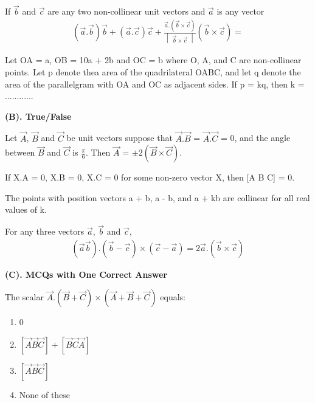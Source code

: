 \item If $\overrightarrow{b}$ and $\overrightarrow{c}$ are any two non-collinear unit vectors and $\overrightarrow{a}$ is any vector 
\begin{align*}
(\overrightarrow{a} . \overrightarrow{b})\overrightarrow{b} + (\overrightarrow{a} . \overrightarrow{c})\overrightarrow{c} + \frac{\overrightarrow{a} . (\overrightarrow{b} \times \overrightarrow{c})}{\begin{vmatrix} \overrightarrow{b} \times \overrightarrow{c} \end{vmatrix}} (\overrightarrow{b} \times \overrightarrow{c}) =
\end{align*}

\item Let OA = a, OB = 10a + 2b and OC = b where O, A, and C are non-collinear points. Let p denote thea area of the quadrilateral OABC, and let q denote the area of the parallelgram with OA and OC as adjacent sides. If p = kq, then k = ............

\textbf{(B). True/False}

\item Let $\overrightarrow{A}$, $\overrightarrow{B}$ and $\overrightarrow{C}$ be unit vectors suppose that $\overrightarrow{A}.\overrightarrow{B}$ = $\overrightarrow{A}.\overrightarrow{C}$ = 0, and the angle between $\overrightarrow{B}$ and $\overrightarrow{C}$ is $\frac{\pi}{6}$. Then $\overrightarrow{A}$ = $\pm 2(\overrightarrow{B} \times \overrightarrow{C})$.

\item If X.A = 0, X.B = 0, X.C = 0 for some non-zero vector X, then [A B C] = 0.

\item The points with position vectors a + b, a - b, and a + kb are collinear for all real values of k.

\item For any three vectors $\overrightarrow{a}$, $\overrightarrow{b}$ and $\overrightarrow{c}$, 
\begin{align*}
(\overrightarrow{a}  \overrightarrow{b}) . (\overrightarrow{b} - \overrightarrow{c}) \times (\overrightarrow{c} - \overrightarrow{a}) = 2\overrightarrow{a} . (\overrightarrow{b} \times \overrightarrow{c})
\end{align*}

\textbf{(C). MCQs with One Correct Answer}
\item The scalar $\overrightarrow{A} . (\overrightarrow{B} + \overrightarrow{C}) \times (\overrightarrow{A} + \overrightarrow{B} + \overrightarrow{C})$ equals:
\begin{enumerate}
\item 0
\item $[\overrightarrow{A}  \overrightarrow{B}  \overrightarrow{C}] + [\overrightarrow{B} \overrightarrow{C} \overrightarrow{A}]$
\item $[\overrightarrow{A} \overrightarrow{B} \overrightarrow{C}]$
\item None of these
\end{enumerate}

